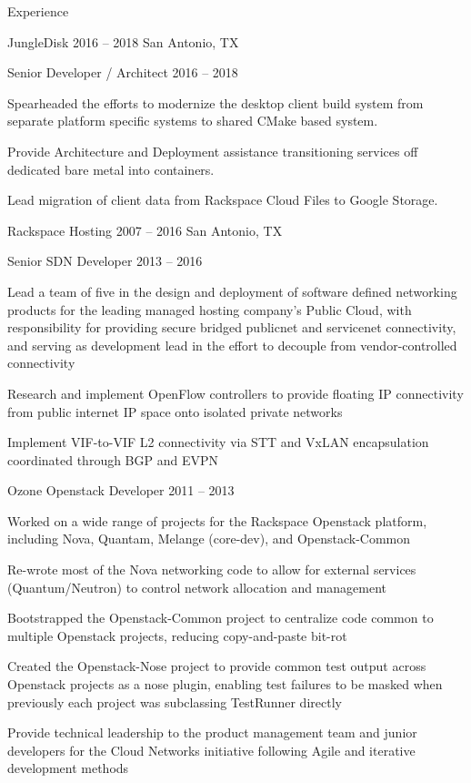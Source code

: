\documentclass{resume}
\begin{document}
\begin{rSection}{Experience}
	\begin{rSubsection}{JungleDisk}
		{2016 -- 2018} %
		{San Antonio, TX}
		\begin{rSubsubsection}{Senior Developer / Architect}
			{2016 -- 2018} %
			{\small
		\item Spearheaded the efforts to modernize the desktop client build system
			from separate platform specific systems to shared CMake based system.
		\item Provide Architecture and Deployment assistance transitioning services
			off dedicated bare metal into containers.
		\item Lead migration of client data from Rackspace Cloud Files to Google
			Storage.
			}
		\end{rSubsubsection}
	\end{rSubsection}

	\begin{rSubsection}{Rackspace Hosting}
		{2007 -- 2016} %
		{San Antonio, TX}
		\begin{rSubsubsection}{Senior SDN Developer}
			{2013 -- 2016} %
			{\small
		\item Lead a team of five in the design and deployment of software defined
			networking products for the leading managed hosting company’s Public
			Cloud, with responsibility for providing secure bridged publicnet and
			servicenet connectivity, and serving as development lead in the effort
			to decouple from vendor-controlled connectivity
		\item Research and implement OpenFlow controllers to provide floating IP
			connectivity from public internet IP space onto isolated private networks
		\item Implement VIF-to-VIF L2 connectivity via STT and VxLAN encapsulation
			coordinated through BGP and EVPN
			}
		\end{rSubsubsection}

		\begin{rSubsubsection}{Ozone Openstack Developer}
			{2011 -- 2013} %
			{\small
		\item Worked on a wide range of projects for the Rackspace Openstack platform,
			including Nova, Quantam, Melange (core-dev), and Openstack-Common
		\item Re-wrote most of the Nova networking code to allow for external services
			(Quantum/Neutron) to control network allocation and management
		\item Bootstrapped the Openstack-Common project to centralize code common to
			multiple Openstack projects, reducing copy-and-paste bit-rot
		\item Created the Openstack-Nose project to provide common test output across
			Openstack projects as a nose plugin, enabling test failures to be masked
			when previously each project was subclassing TestRunner directly
		\item Provide technical leadership to the product management team and junior
			developers for the Cloud Networks initiative following Agile and iterative
			development methods
			}
		\end{rSubsubsection}


\end{rSubsection}
\end{rSection}
\end{document}
